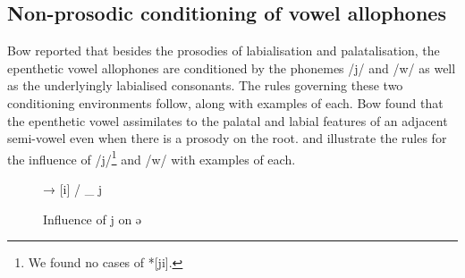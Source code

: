 \begin{table}
\caption{Underlying prosody patterns in two and three syllable words\label{tab:2.11}}
\end{table}
\subsection{ Non-prosodic conditioning of vowel allophones}\label{sec:2.3.3}
\hypertarget{RefHeading1210601525720847}{}
Bow reported that besides the prosodies of labialisation and palatalisation, the epenthetic vowel allophones are conditioned by the phonemes /j/ and /w/ as well as the underlyingly labialised consonants.  The rules governing these two conditioning environments follow, along with examples of each. Bow found that the epenthetic vowel assimilates to the palatal and labial features of an adjacent semi-vowel even when there is a prosody on the root.   and  illustrate the rules for the influence of /j/\footnote{We found no cases of *[ji].} and /w/ with examples of each. 

\begin{figure}
\begin{centering}[ə] → [i] / \_ j\end{centering}
\caption{Influence of j on ə\label{fig:2.4}}
\end{figure}


